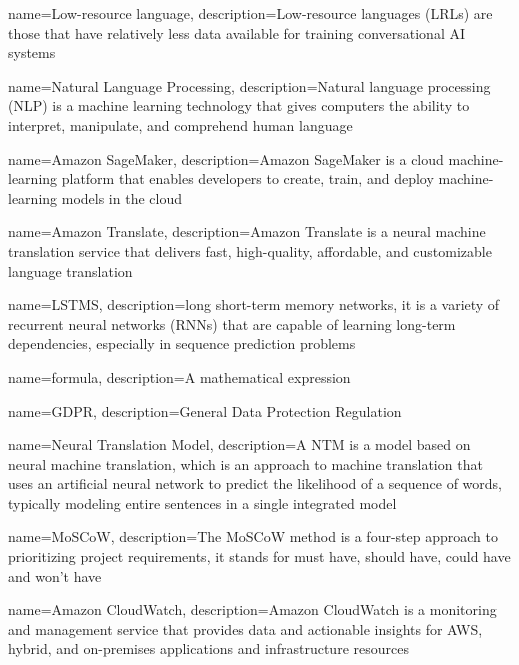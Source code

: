 

{
        name=Low-resource language,
        description={Low-resource languages (LRLs) are those that have relatively less data available for training conversational AI systems}
}

{
        name=Natural Language Processing,
        description={Natural language processing (NLP) is a machine learning technology that gives computers the ability to interpret, manipulate, and comprehend human language}
}

{
        name=Amazon SageMaker,
        description={Amazon SageMaker is a cloud machine-learning platform that enables developers to create, train, and deploy machine-learning models in the cloud}
}

{
        name=Amazon Translate,
        description={Amazon Translate is a neural machine translation service that delivers fast, high-quality, affordable, and customizable language translation}
}

{
        name=LSTMS,
        description={long short-term memory networks, it is a variety of recurrent neural networks (RNNs) that are capable of learning long-term dependencies, especially in sequence prediction problems}
}

{
        name=formula,
        description={A mathematical expression}
}

{
        name=GDPR,
        description={General Data Protection Regulation}
}

{
        name=Neural Translation Model,
        description={A NTM is a model based on neural machine translation, which is an approach to machine translation that uses an artificial neural network to predict the likelihood of a sequence of words, typically modeling entire sentences in a single integrated model}
}

{
        name=MoSCoW,
        description={The MoSCoW method is a four-step approach to prioritizing project requirements, it stands for must have, should have, could have and won't have}
}

{
        name=Amazon CloudWatch,
        description={Amazon CloudWatch is a monitoring and management service that provides data and actionable insights for AWS, hybrid, and on-premises applications and infrastructure resources}
}






